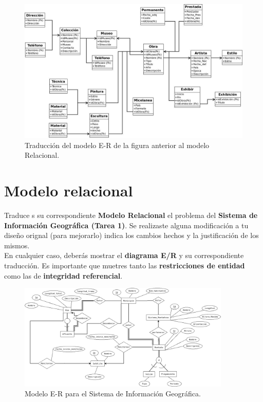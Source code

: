 \documentclass{article}
\begin{document}
    \begin{figure}[H]
    	\begin{center}
    		\includegraphics[width=1\textwidth]{MRProblema2.jpeg}
    	\end{center}
    	\caption{Traducción del modelo E-R de la figura anterior al modelo Relacional.}
    \end{figure}
        
    \section{Modelo relacional}
    Traduce s su correspondiente \textbf{Modelo Relacional} el problema del 
    \textbf{Sistema de Información Geográfica (Tarea 1)}. Se realizaste alguna
    modificación a tu diseño orignal (para mejorarlo) indica los cambios hechos 
    y la justificación de los mismos.\\
    En cualquier caso, deberás mostrar el \textbf{diagrama E/R} y su
    correspondiente traducción. Es importante que muetres tanto las 
    \textbf{restricciones de entidad} como las de \textbf{integridad referencial}.
    
    \begin{figure}[H]
    	\begin{center}
    		\includegraphics[width=0.9\textwidth]{2b.png}
    	\end{center}
    	\caption{Modelo E-R para el Sistema de Información Geográfica.}
    \end{figure}
    
\end{document}
